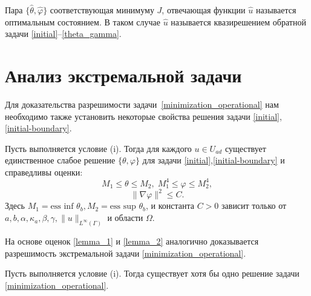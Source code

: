 \documentclass[10pt]{article}
\begin{document}
    Пара $\{\hat{\theta}, \hat{\varphi} \}$ соответствующая минимуму $J$, отвечающая функции $\hat{u}$ называется оптимальным состоянием. В таком случае $\hat{u}$ называется квазирешением обратной задачи \eqref{initial}--\eqref{theta_gamma}.



    \section{Анализ экстремальной задачи}
    \label{sec:optimality}

    Для доказательства разрешимости задачи~\eqref{minimization_operational} нам необходимо также установить некоторые свойства решения задачи \eqref{initial}, \eqref{initial-boundary}.

    \begin{lem}
        \label{SolvabilityLemma}
        Пусть выполняется условие (i). Тогда для каждого $ u \in U_{ad} $ существует единственное слабое решение $\{\theta, \varphi \}$ для задачи \eqref{initial},\eqref{initial-boundary} и справедливы оценки:
        \begin{equation}
            \label{lemma_1}
            M_1 \le \theta \le M_2, \; M_1^4 \le \varphi \le M_2^4,
        \end{equation}
        \begin{equation}
            \label{lemma_2}
            \| \nabla \varphi \|^2 \le C.
        \end{equation}
        Здесь $M_1 = \text{ess inf } \theta_b, M_2 = \text{ess sup } \theta_b$, и константа $C > 0$ зависит только от \\ $a, b, \alpha, \kappa_a, \beta, \gamma, \|u\|_{L^\infty(\Gamma)}$ и области $\Omega$.
    \end{lem}

    На основе оценок \eqref{lemma_1} и \eqref{lemma_2} аналогично \cite{cheb_origin} доказывается разрешимость экстремальной задачи \eqref{minimization_operational}.
    \begin{thm}
        Пусть выполняется условие (i). Тогда существует хотя бы одно решение задачи \eqref{minimization_operational}.
    \end{thm}
\end{document}
